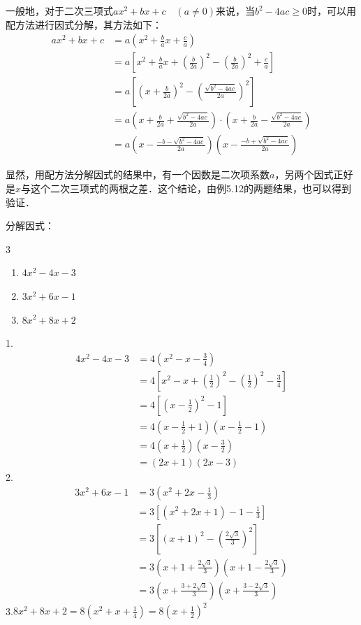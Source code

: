 一般地，对于二次三项式$ax^2+bx+c\quad (a\ne 0)$来说，当$b^2-4ac\ge 0$时，可以用配方法进行因式分解，其方法如下：
\[\begin{split}
    ax^2+bx+c &=a\left(x^2+\frac{b}{a}x+\frac{c}{a}\right)\\
    &=a\left[x^2+\frac{b}{a}x+\left(\frac{b}{2a}\right)^2-\left(\frac{b}{2a}\right)^2+\frac{c}{a}\right]\\
    &=a\left[\left(x+\frac{b}{2a}\right)^2-\left(\frac{\sqrt{b^2-4ac}}{2a}\right)^2\right]\\
    &=a\left(x+\frac{b}{2a}+\frac{\sqrt{b^2-4ac}}{2a}\right)\cdot \left(x+\frac{b}{2a}-\frac{\sqrt{b^2-4ac}}{2a}\right)\\
    &=a\left(x-\frac{-b-\sqrt{b^2-4ac}}{2a}\right)\left(x-\frac{-b+\sqrt{b^2-4ac}}{2a}\right)
\end{split}\]

显然，用配方法分解因式的结果中，有一个因数是二次项系数$a$，另两个因式正好是$x$与这个二次三项式的两根之差．这个结论，由例5.12的两题结果，也可以得到验证．

\begin{example}
  分解因式： 
  \begin{multicols}{3}
    \begin{enumerate}
        \item $4x^2-4x-3$
        \item $3x^2+6x-1$
        \item $8x^2+8x+2$
    \end{enumerate}
  \end{multicols}
\end{example}



\begin{solution}
 1.\[\begin{split}
    4x^2-4x-3&=4\left(x^2-x-\frac{3}{4}\right)\\
    &=4\left[x^2-x+\left(\frac{1}{2}\right)^2-\left(\frac{1}{2}\right)^2-\frac{3}{4}\right]\\
    &=4\left[\left(x-\frac{1}{2}\right)^2-1\right]\\
    &=4\left(x-\frac{1}{2}+1\right)\left(x-\frac{1}{2}-1\right)\\
    &=4\left(x+\frac{1}{2}\right)\left(x-\frac{3}{2}\right)\\
    &=(2x+1)(2x-3)
 \end{split}\]   
 2.\[\begin{split}
    3x^2+6x-1&=3\left(x^2+2x-\frac{1}{3}\right)\\
    &=3\left[(x^2+2x+1)-1-\frac{1}{3}\right]\\
    &=3\left[(x+1)^2-\left(\frac{2\sqrt{3}}{3}\right)^2\right]\\
    &=3\left(x+1+\frac{2\sqrt{3}}{3}\right)\left(x+1-\frac{2\sqrt{3}}{3}\right)\\
    &=3\left(x+\frac{3+2\sqrt{3}}{3}\right)\left(x+\frac{3-2\sqrt{3}}{3}\right)
 \end{split}\]  
 3.\quad$8x^2+8x+2=8\left(x^2+x+\frac{1}{4}\right) =8\left(x+\frac{1}{2}\right)^2$
\end{solution}

